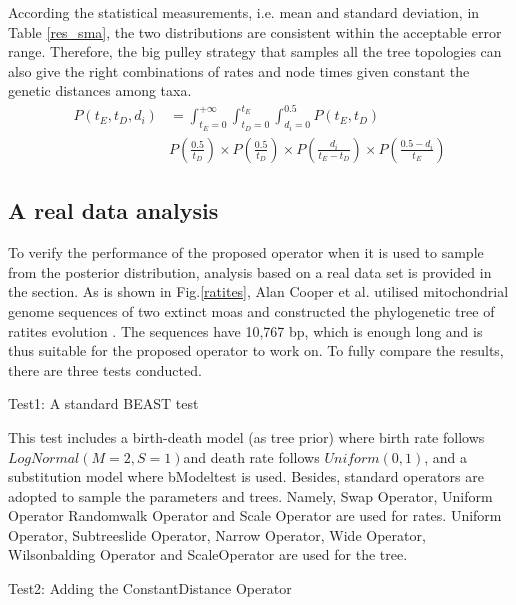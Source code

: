 \documentclass{bmcart}
\begin{document}
According the statistical measurements, i.e. mean and standard deviation, in Table \ref{res_sma}, the two distributions are consistent within the acceptable error range. Therefore, the big pulley strategy that samples all the tree topologies can also give the right combinations of rates and node times given constant the genetic distances among taxa.
\begin{equation}
\label{integration5}
\begin{aligned}
P({t_E},{t_D},{d_i}) &= \int_{{t_E} = 0}^{ + \infty } {\int_{{t_D} = 0}^{{t_E}} {\int_{{d_i} = 0}^{0.5} {P({t_E},{t_D})} } } \\&P(\frac{{0.5}}{{{t_D}}}) \times P(\frac{{0.5}}{{{t_D}}}) \times P(\frac{{{d_i}}}{{{t_E} - {t_D}}}) \times P(\frac{{0.5 - {d_i}}}{{{t_E}}})
\end{aligned}
\end{equation}

\subsection*{A real data analysis}
To verify the performance of the proposed operator when it is used to sample from the posterior distribution, analysis based on a real data set is provided in the section. As is shown in Fig.\ref{ratites}, Alan Cooper et al. utilised mitochondrial genome sequences of two extinct moas and constructed the phylogenetic tree of ratites evolution \cite{cooper2001complete}. The sequences have 10,767 bp, which is enough long and is thus suitable for the proposed operator to work on. To fully compare the results, there are three tests conducted. 

\begin{description}
\item[Test1: A standard BEAST test ] 
\end{description}

This test includes a birth-death model (as tree prior) where birth rate follows $LogNormal(M = 2, S = 1)$and death rate follows $Uniform(0, 1)$, and a substitution model where bModeltest is used.  Besides, standard operators are adopted to sample the parameters and trees. Namely, Swap Operator, Uniform Operator Randomwalk Operator and Scale Operator are used for rates. Uniform Operator, Subtreeslide Operator, Narrow Operator, Wide Operator, Wilsonbalding Operator and ScaleOperator are used for the tree. 
\begin{description}
\item[Test2: Adding the ConstantDistance Operator ] 
\end{description}
\end{document}
